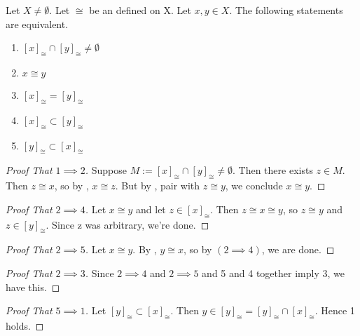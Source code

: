 \begin{prop}
    \label{prop:EquivalenceClassesPartition}
    
    Let $X \neq \emptyset$. 
    Let $\cong$ be an 
	\EquivalenceRelation
	defined on X. 
    Let $x,y \in X$. 
    The following statements are equivalent. 
    \begin{enumerate}
        \item $[x]_{\cong}  \cap [y]_{\cong} \neq \emptyset$
        \item $x \cong y$
        \item $[x]_{\cong} = [y]_{\cong}$
        \item $[x]_{\cong} \subset [y]_{\cong}$
        \item $[y]_{\cong} \subset [x]_{\cong}$ 
    \end{enumerate}
    
\begin{proof}[Proof That $1 \implies 2$]
Suppose $M:=[x]_{\cong} \cap [y]_{\cong} \neq \emptyset$. 
Then there exists $z \in M$.
Then $z \cong x$, so by \RelationSymmetry, $x \cong z$. 
But by \RelationTransitivity, pair with $z \cong y$, we conclude $x \cong y$. 
\end{proof}
\begin{proof}[Proof That $2 \implies 4$]
    Let $x \cong y$ and let $z \in [x]_{\cong}$. 
    Then $z \cong x \cong y$, so $z \cong y$ and $z \in [y]_{\cong}$.
    Since z was arbitrary, we're done. 
\end{proof}
\begin{proof}[Proof That $2 \implies 5$]
    Let $x \cong y$. By 
	\RelationSymmetry, $y \cong x$, so by $(2 \implies 4)$, we are done. 
\end{proof}
\begin{proof}[Proof That $2 \implies 3$]
    Since  $2 \implies 4$ and $2 \implies 5$ and 5 and 4 together imply 3, we have this. 
\end{proof}
\begin{proof}[Proof That $5 \implies 1$]
    Let $[y]_{\cong} \subset [x]_{\cong}$. 
    Then $y \in [y]_{\cong} = [y]_{\cong} \cap [x]_{\cong} $.
    Hence 1 holds. 
\end{proof}

\end{prop} 